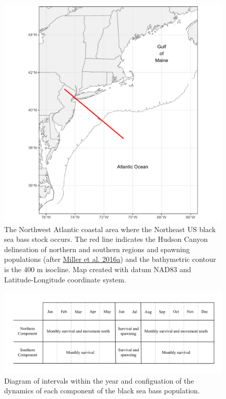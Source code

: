 \documentclass[
]{article}
\begin{document}
\begin{figure}

{\centering \includegraphics[width=1\linewidth]{map} 

}

\caption{The Northwest Atlantic coastal area where the Northeast US black sea bass stock occurs. The red line indicates the Hudson Canyon delineation of northern and southern regions and spawning populations (after \protect\hyperlink{ref-milleretal16_yoy_survival}{Miller et al. 2016a}) and the bathymetric contour is the 400 m isocline. Map created with datum NAD83 and Latitude-Longitude coordinate system.}\label{fig:map}
\end{figure}
\pagebreak

\begin{figure}

{\centering \includegraphics[width=0.8\linewidth]{bsb_movement_diagram} 

}

\caption{Diagram of intervals within the year and configuation of the dynamics of each component of the black sea bass population.}\label{fig:migration-diagram}
\end{figure}
\pagebreak
\end{document}
